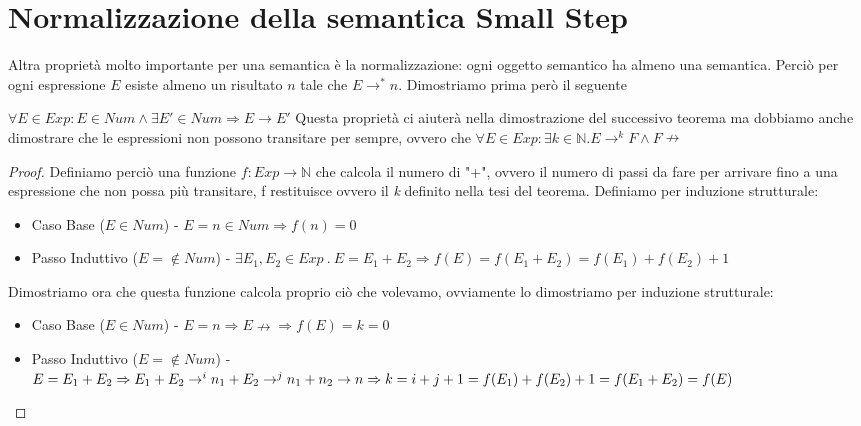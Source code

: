 \section{Normalizzazione della semantica Small Step} 
Altra proprietà molto importante per una semantica è la normalizzazione:
ogni oggetto semantico ha almeno una semantica. Perciò per ogni espressione $E$
esiste almeno un risultato $n$ tale che $E \rightarrow ^* n$.
Dimostriamo prima però il seguente

\begin{teorema}
  $\forall E \in Exp : E \in Num \land \exists E' \in Num \Rightarrow E \rightarrow E'$
  Questa proprietà ci aiuterà nella dimostrazione del successivo teorema ma dobbiamo anche dimostrare che le espressioni non possono transitare per sempre,
  ovvero che $\forall E \in Exp : \exists k \in \mathbb{N} . E \rightarrow ^k F \land F \nrightarrow$
\end{teorema}

\begin{proof}
  Definiamo perciò una funzione $f : Exp \rightarrow \mathbb{N}$ che calcola il numero di "+", ovvero il numero di passi da fare per arrivare fino a una
  espressione che non possa più transitare, f restituisce ovvero il \emph{k} definito nella tesi del teorema. Definiamo per induzione strutturale:
  \begin{itemize}
    \item Caso Base ($E \in Num$) - $E = n \in Num \Rightarrow f(n) = 0$
    \item Passo Induttivo ($E = \not \in Num$) - $\exists E_1, E_2 \in Exp\ .\ E = E_1 + E_2 \Rightarrow f(E) = f(E_1 + E_2) = f(E_1) + f(E_2) + 1$
  \end{itemize}
  Dimostriamo ora che questa funzione calcola proprio ciò che volevamo, ovviamente lo dimostriamo per induzione strutturale:
  \begin{itemize}
  \item Caso Base ($E \in Num$) - $E = n \Rightarrow E \nrightarrow \Rightarrow f(E) = k = 0$
  \item Passo Induttivo ($E = \not \in Num$) - $E = E_1 + E_2 \Rightarrow \\ E_1 + E_2 \rightarrow ^i n_1 + E_2 \rightarrow ^j n_1 + n_2 \rightarrow n \\
    \Rightarrow k = i + j + 1 = f(E_1) + f(E_2) + 1 = f(E_1 + E_2) = f(E)$
  \end{itemize}
\end{proof}

